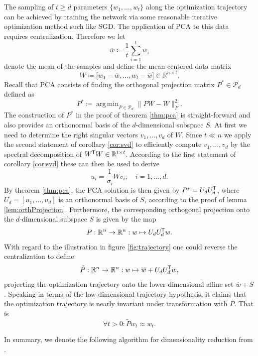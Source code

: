 \documentclass[11pt, a4paper]{article}
\newcommand{\R}{\mathbb{R}}
\renewcommand{\P}{\mathcal{P}}
\newcommand*{\tr}{^{\mkern-1.5mu\mathsf{T}}}
\DeclareMathOperator*{\argmin}{arg\,min}
\begin{document}
The sampling of $t \geq d$ parameters $\{ w_1, \dots, w_t \}$ along the optimization trajectory can be achieved by training the network via some reasonable iterative optimization method such like SGD. The application of PCA to this data requires centralization. Therefore we let
\[ \overline{w} \coloneq \frac{1}{t} \sum_{i=1}^{t} w_i \]
denote the mean of the samples and define the mean-centered data matrix
\[ W \coloneq \big [ w_1 - \overline{w}, \dots, w_t - \overline{w} \big ] \in \R^{n \times t}. \]
Recall that PCA consists of finding the orthogonal projection matrix $P^* \in \P_d$ defined as
\[ P^* \coloneq \argmin_{P \in \P_d} \big \| PW - W \big \|_F^2. \]
The construction of $P^*$ in the proof of theorem \ref{thm:pca} is straight-forward and also provides an orthonormal basis of the $d$-dimensional subspace $S$. At first we need to determine the right singular vectors $v_1, \dots, v_d$ of $W$. Since $t \ll n$ we apply the second statement of corollary \ref{cor:svd} to efficiently compute $v_1, \dots, v_d$ by the spectral decomposition of $W\tr W \in \R^{t \times t}$. According to the first statement of corollary \ref{cor:svd} these can then be used to derive
\[ u_i = \frac{1}{\sigma_i} Wv_i, \quad i=1, \dots, d. \]
By theorem \ref{thm:pca}, the PCA solution is then given by $P^* = U_dU_d \tr$, where $U_d = [u_1, \dots, u_d]$ is an orthonormal basis of $S$, according to the proof of lemma \ref{lem:orthProjection}. Furthermore, the corresponding orthogonal projection onto the $d$-dimensional subspace $S$ is given by the map
\[ P : \R^n \to \R^n : w \mapsto U_dU_d\tr w. \]
With regard to the illustration in figure \ref{fig:trajectory} one could reverse the centralization to define
\[ \tilde{P} : \R^n \to \R^n : w \mapsto \overline{w} + U_dU_d\tr w, \]
projecting the optimization trajectory onto the lower-dimensional affine set $\overline{w} + S$. Speaking in terms of the low-dimensional trajectory hypothesis, it claims that the optimization trajectory is nearly invariant under transformation with $\tilde{P}$. That is 
\[ \forall t>0: \tilde{P}w_t \approx w_t. \]

In summary, we denote the following algorithm for dimensionality reduction from \cite{Paper}.
\end{document}
